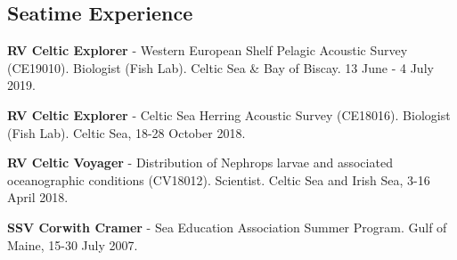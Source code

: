 \documentclass[a4paper]{deedy-resume} %
\begin{document}
\begin{flushleft}
\sectionspace %



\section{Seatime Experience}
\sectionspace

\begin{tightitemize}
\item \textbf{RV Celtic Explorer} - Western European Shelf Pelagic Acoustic Survey (CE19010). Biologist (Fish Lab). Celtic Sea \& Bay of Biscay. 13 June - 4 July 2019.
\item \textbf{RV Celtic Explorer} - Celtic Sea Herring Acoustic Survey (CE18016). Biologist (Fish Lab). Celtic Sea, 18-28 October 2018. 
\item \textbf{RV Celtic Voyager} - Distribution of Nephrops larvae and associated oceanographic conditions (CV18012). Scientist. Celtic Sea and Irish Sea, 3-16 April 2018.
\item \textbf{SSV Corwith Cramer} - Sea Education Association Summer Program. Gulf of Maine, 15-30 July 2007.
\end{tightitemize}

\sectionspace %

\end{flushleft}
\end{document}
